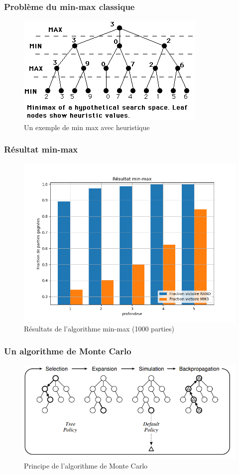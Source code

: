 \message{ !name(test.tex)}\documentclass{beamer}
\begin{document}
\begin{frame}
  \frametitle{Problème du min-max classique}
  \begin{figure}
    \centering
    \includegraphics[width=0.8\linewidth]{ressources/min_max_heuristique.png}
    \caption{Un exemple de min max avec heuristique}
  \end{figure}
\end{frame}

\begin{frame}
  \frametitle{Résultat min-max}
  \begin{figure}
    \centering
    \includegraphics[width=0.75\linewidth]{ressources/resultat_min_max.png}
    \caption{Résultats de l'algorithme min-max (1000 parties)}
  \end{figure}
\end{frame}

\begin{frame}
  \frametitle{Un algorithme de Monte Carlo}
  \begin{figure}
    \centering
    \includegraphics[width=\linewidth]{ressources/monte_carlo_explication.png}
    \caption{Principe de l'algorithme de Monte Carlo}
  \end{figure}
\end{frame}
\end{document}
